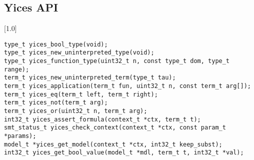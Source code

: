 \subsection{Yices API}
\begin{frame}
\scalebox{0.8}[1.0]{\begin{minipage}{40em}
\texttt{{\colEm type\_t} yices\_bool\_type({\colEm void});}
\\[0.25em]							
\texttt{{\colEm type\_t} yices\_new\_uninterpreted\_type({\colEm void});}
\\[0.25em]							
\texttt{{\colEm type\_t} yices\_function\_type({\colEm uint32\_t} n, const {\colEm type\_t} dom{\colEm []}, {\colEm type\_t} range);}
\\[0.75em]							
\texttt{{\colEm term\_t} yices\_new\_uninterpreted\_term({\colEm type\_t} tau);}
\\[0.25em]
\texttt{{\colEm term\_t} yices\_application({\colEm term\_t} fun, {\colEm uint32\_t} n, const {\colEm term\_t} arg[]);}
\\[0.25em]
\texttt{{\colEm term\_t} yices\_eq({\colEm term\_t} left, {\colEm term\_t} right);}
\\[0.75em]
\texttt{{\colEm term\_t} yices\_not({\colEm term\_t} arg);}
\\[0.25em]
\texttt{{\colEm term\_t} yices\_or({\colEm uint32\_t} n, {\colEm term\_t} arg{\colEm []});}
\\[0.75em]
\texttt{{\colEm int32\_t} yices\_assert\_formula({\colEm context\_t *ctx}, {\colEm term\_t} t);}
\\[0.75em]
\texttt{{\colEm smt\_status\_t} yices\_check\_context({\colEm context\_t *}ctx, const {\colEm param\_t *}params);}
\\[0.25em]
\texttt{{\colEm model\_t} *yices\_get\_model({\colEm context\_t *}ctx, {\colEm int32\_t} keep\_subst);}
\\[0.25em]
\texttt{{\colEm int32\_t} yices\_get\_bool\_value({\colEm model\_t *}mdl, {\colEm term\_t} t, {\colEm int32\_t *}val);}

\end{minipage}}
							
							
						
	
						\end{frame}
